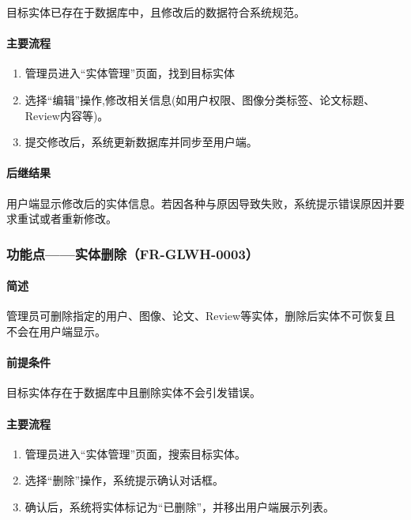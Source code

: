 {目标实体已存在于数据库中，且修改后的数据符合系统规范。

\paragraph*{主要流程}

\begin{enumerate}
    \item 管理员进入“实体管理”页面，找到目标实体
    \item 选择“编辑”操作,修改相关信息(如用户权限、图像分类标签、论文标题、Review内容等)。
    \item 提交修改后，系统更新数据库并同步至用户端。
\end{enumerate}

\paragraph*{后继结果}

用户端显示修改后的实体信息。若因各种与原因导致失败，系统提示错误原因并要求重试或者重新修改。

\subsubsection{功能点——实体删除（FR-GLWH-0003）}

\paragraph*{简述}

管理员可删除指定的用户、图像、论文、Review等实体，删除后实体不可恢复且不会在用户端显示。

\paragraph*{前提条件}

目标实体存在于数据库中且删除实体不会引发错误。

\paragraph*{主要流程}

\begin{enumerate}
    \item 管理员进入“实体管理”页面，搜索目标实体。
    \item 选择“删除”操作，系统提示确认对话框。
    \item 确认后，系统将实体标记为“已删除”，并移出用户端展示列表。
\end{enumerate}

}
